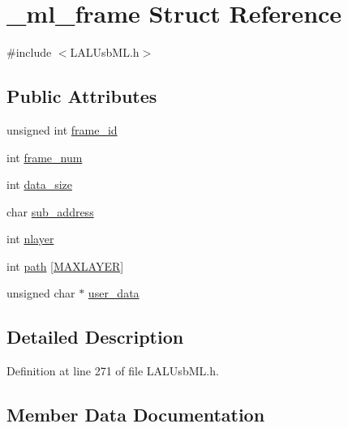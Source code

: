\hypertarget{struct__ml__frame}{}\section{\+\_\+ml\+\_\+frame Struct Reference}
\label{struct__ml__frame}


{\ttfamily \#include $<$L\+A\+L\+Usb\+M\+L.\+h$>$}

\subsection*{Public Attributes}
\begin{DoxyCompactItemize}
\item 
unsigned int \hyperlink{struct__ml__frame_a0c4a762a0c824490d209cd4705572eba}{frame\+\_\+id}
\item 
int \hyperlink{struct__ml__frame_ad91a6f0e37163fda1c1e1319fcac564d}{frame\+\_\+num}
\item 
int \hyperlink{struct__ml__frame_a30f2e0cf2d4d6693c8b6eadcbc5f72cd}{data\+\_\+size}
\item 
char \hyperlink{struct__ml__frame_a52d6a12345a0cc37bfc2d5c29e09d47b}{sub\+\_\+address}
\item 
int \hyperlink{struct__ml__frame_aae489f8d32e2a4d60ed976c44b8a4495}{nlayer}
\item 
int \hyperlink{struct__ml__frame_a16f43a5a0b9c1d56c2abeac26429ed54}{path} \mbox{[}\hyperlink{LALUsbML_8h_acaee23bf97a6add491dd394ceb68cd1a}{M\+A\+X\+L\+A\+Y\+ER}\mbox{]}
\item 
unsigned char $\ast$ \hyperlink{struct__ml__frame_a0bf29f8a45b29b63e8593dcfb2a15ff6}{user\+\_\+data}
\end{DoxyCompactItemize}


\subsection{Detailed Description}


Definition at line 271 of file L\+A\+L\+Usb\+M\+L.\+h.



\subsection{Member Data Documentation}
\mbox{\label{struct__ml__frame_a30f2e0cf2d4d6693c8b6eadcbc5f72cd}} 
